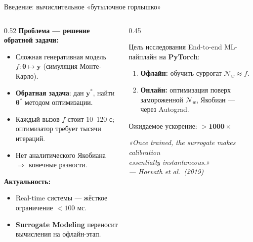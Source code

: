 \documentclass[11pt, aspectratio=169]{beamer}
\begin{document}
\begin{frame}[shrink=5]{Введение: вычислительное «бутылочное горлышко»}
  \begin{columns}[T]
    \begin{column}{0.52\textwidth}
      \textbf{Проблема — решение обратной задачи:}
      \begin{itemize}\small
        \item Сложная генеративная модель
              $f:\boldsymbol\theta\!\mapsto\!\mathbf{y}$
              (симуляция Монте-Карло).
        \item \textbf{Обратная задача}: дан $\mathbf{y}^*$,
              найти $\boldsymbol\theta^*$ методом оптимизации.
        \item Каждый вызов $f$ стоит \alert{10--120 с}; оптимизатор
              требует тысячи итераций.
        \item Нет аналитического Якобиана
              $\Rightarrow$ конечные разности.
      \end{itemize}

      \smallskip
      \textbf{Актуальность:}
      \begin{itemize}\small
        \item Real-time системы — жёсткое ограничение $<\!100$ мс.
        \item \textbf{Surrogate Modeling} переносит вычисления
              на офлайн-этап.
      \end{itemize}
    \end{column}

    \begin{column}{0.45\textwidth}
      \begin{block}{Цель исследования}
        \small
        End-to-end ML-пайплайн на \textbf{PyTorch}:
        \medskip
        \begin{enumerate}
          \item \textbf{Офлайн:} обучить суррогат
                $\mathcal{N}_w\!\approx\!f$.
          \item \textbf{Онлайн:} оптимизация поверх
                замороженной $\mathcal{N}_w$,
                Якобиан — через Autograd.
        \end{enumerate}
        \medskip
        Ожидаемое ускорение: $\mathbf{>\!1000\times}$
      \end{block}
      \medskip
      {\small\itshape
       «Once trained, the surrogate makes calibration\\
        essentially instantaneous.»\\
        \hfill--- Horvath et al.\ (2019)}
    \end{column}
  \end{columns}
\end{frame}
\end{document}
